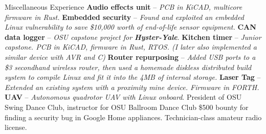 \begin{rubric}{Miscellaneous Experience}
%
  \entry*[2023] \textbf{Audio effects unit} -- \textit{PCB in KiCAD, multicore firmware in Rust.}
%
  \entry*[2023] \textbf{Embedded security} -- \textit{Found and exploited an embedded Linux vulnerability to save \$10,000 worth of end-of-life sensor equipment.}
%
  \entry*[2022] \textbf{CAN data logger} -- \textit{OSU capstone project for \textbf{Hyster-Yale}}.
%
  \entry*[2022] \textbf{Kitchen timer} -- \textit{Junior capstone. PCB in KiCAD, firmware in Rust, RTOS. \hfill\break (I later also implemented a similar device with AVR and C)}
%
  \entry*[2019] \textbf{Router repurposing} -- \textit{Added USB ports to a \$3 secondhand wireless router, then used a homemade diskless distributed build system to compile Linux and fit it into the 4MB of internal storage.}
%
  \entry*[$\cdots\cdot$] \textbf{Laser Tag} -- \textit{Extended an existing system with a proximity mine device. Firmware in FORTH.}
%
  \entry*[$\cdots\cdot$] \textbf{UAV} -- \textit{Autonomous quadrotor UAV with Linux onboard}.
\entry*[2020-2023] President of OSU Swing Dance Club, instructor for OSU Ballroom Dance Club
\entry*[2020] \$500 bounty for finding a security bug in Google Home appliances.
\entry*[] Technician-class amateur radio license.

\end{rubric}
